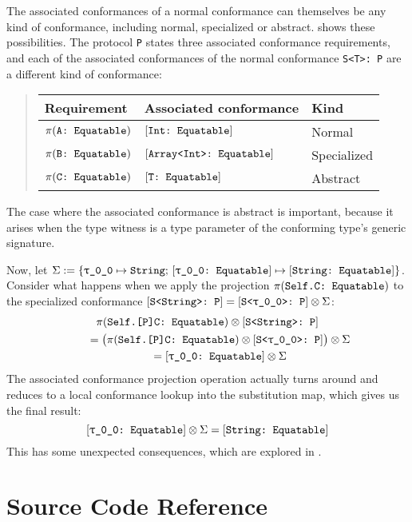 \documentclass[../generics]{subfiles}
\begin{document}
\begin{example}
The associated conformances of a normal conformance can themselves be any kind of conformance, including normal, specialized or abstract.  shows these possibilities. The protocol \texttt{P} states three associated conformance requirements, and each of the associated conformances of the normal conformance \verb|S<T>: P| are a different kind of conformance:
\begin{quote}
\begin{tabular}{lll}
\toprule
\textbf{Requirement}&\textbf{Associated conformance}&\textbf{Kind}\\
\midrule
$\pi(\texttt{A:~Equatable})$&$[\texttt{Int:~Equatable}]$&Normal\\
$\pi(\texttt{B:~Equatable})$&$[\texttt{Array<Int>:~Equatable}]$&Specialized\\
$\pi(\texttt{C:~Equatable})$&$[\texttt{T:~Equatable}]$&Abstract\\
\bottomrule
\end{tabular}
\end{quote}
The case where the associated conformance is abstract is important, because it arises when the type witness is a type parameter of the conforming type's generic signature.

Now, let $\Sigma:=\{\texttt{\texttt{$\uptau$\_0\_0}} \mapsto \texttt{String};\,[\texttt{\texttt{$\uptau$\_0\_0}:~Equatable}] \mapsto [\texttt{String:~Equatable}]\}$.
Consider what happens when we apply the projection $\pi(\texttt{Self.C:~Equatable})$ to the specialized conformance $[\texttt{S<String>:~P}]=[\texttt{S<\texttt{$\uptau$\_0\_0}>:~P}]\otimes\Sigma$:
\begin{gather*}
\pi(\texttt{Self.[P]C:~Equatable}) \otimes [\texttt{S<String>:~P}]\\
\qquad {} = \bigl(\pi(\texttt{Self.[P]C:~Equatable}) \otimes[\texttt{S<\texttt{$\uptau$\_0\_0}>:~P}]\bigr)\otimes\Sigma\\
\qquad {} = [\texttt{\texttt{$\uptau$\_0\_0}:~Equatable}] \otimes\Sigma
\end{gather*}
The associated conformance projection operation actually turns around and reduces to a local conformance lookup into the substitution map, which gives us the final result:
\[[\texttt{\texttt{$\uptau$\_0\_0}:~Equatable}] \otimes \Sigma = [\texttt{String:~Equatable}]\]
This has some unexpected consequences, which are explored in .
\end{example}

\section{Source Code Reference}\label{conformancesourceref}
\end{document}
